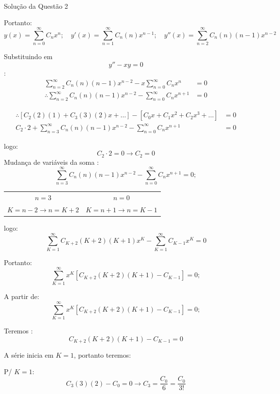\documentclass[8pt,aspectratio = 169]{beamer}
\begin{document}
\begin{frame}[allowframebreaks]{Solução da Questão 2}
\small 

Portanto:
\[ 
y(x) = \sum_{n=0}^{\infty} C_n x^n ; \quad 
y'(x) = \sum_{n=1}^{\infty} C_n (n) x^{n-1} ; \quad 
y''(x) = \sum_{n=2}^{\infty} C_n (n)(n-1) x^{n-2} 
\]

\noindent Substituindo em \[ y'' - xy = 0 \]:
\begin{align*}
    \sum_{n=2}^{\infty} C_n (n)(n-1) x^{n-2} - x \sum_{n=0}^{\infty} C_n x^n &= 0 \\[1ex]
    \therefore\sum_{n=2}^{\infty} C_n (n)(n-1) x^{n-2} - \sum_{n=0}^{\infty} C_n x^{n+1} &= 0 
\end{align*}

\begin{align*}
    \therefore[C_2(2)(1) + C_3(3)(2)x +\dots] - [C_0 x + C_1 x^2 + C_2 x^3 +\dots] &= 0 \\[1ex]
    C_2 \cdot 2 + \sum_{n=3}^{\infty} C_n (n)(n-1) x^{n-2} - \sum_{n=0}^{\infty} C_n x^{n+1} &= 0 
\end{align*}

\framebreak %

\noindent logo:
\[ C_2 \cdot 2 = 0 \rightarrow \boxed{C_2 = 0} \]
Mudança de variáveis da soma
\noindent:
\[ \sum_{n=3}^{\infty} C_n (n)(n-1) x^{n-2} - \sum_{n=0}^{\infty} C_n x^{n+1} = 0 ; \]

\begin{center}
    \begin{tabular}{cc}
        $n=3$ & $n=0$ \\
        $K = n - 2 \rightarrow n = K + 2$ & $K = n + 1 \rightarrow n = K - 1$
    \end{tabular}
\end{center}

\noindent logo:
\[ \sum_{K=1}^{\infty} C_{K+2} (K+2)(K+1) x^K - \sum_{K=1}^{\infty} C_{K-1} x^K = 0  \]

\noindent Portanto:
\[ \sum_{K=1}^{\infty} x^K [ C_{K+2} (K+2)(K+1) - C_{K-1} ] = 0 ;\]

\framebreak %

A partir de:
\[ \sum_{K=1}^{\infty} x^K [ C_{K+2} (K+2)(K+1) - C_{K-1} ] = 0 ;\]

Teremos
\noindent :
\[ C_{K+2} (K+2)(K+1) - C_{K-1} = 0 \]

\noindent A série inicia em $K=1$, portanto teremos:

\vspace{0.3cm}
\noindent P/ $K=1$:
\[ C_3 (3)(2) - C_0 = 0 \rightarrow C_3 = \frac{C_0}{6} = \frac{C_0}{3!} \]


\end{frame}
\end{document}
